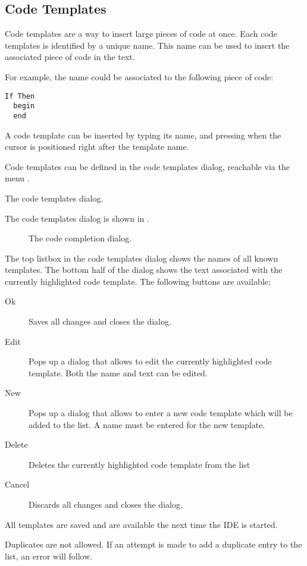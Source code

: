 \subsection{Code Templates}
Code templates are a way to insert large pieces of code at once. Each 
code templates is identified by a unique name. This name can be used to
insert the associated piece of code in the text.

For example, the name  could be associated to the following
piece of code:
\begin{verbatim}
If Then
  begin
  end
\end{verbatim}
A code template can be inserted by typing its name, and pressing 
when the cursor is positioned right after the template name.

Code templates can be defined in the code templates dialog, reachable via
the menu . 

\begin{htmlonly}
The code templates dialog.
\end{htmlonly}
\begin{latexonly}
The code templates dialog is shown in .
\begin{figure}[ht]
\caption{The code completion dialog.}\label{fig:codetemp}
\ifpdf
{}
\else
{}
\fi
\end{figure}
\end{latexonly}
The top listbox in the code templates dialog shows the names of all 
known templates. The bottom half of the dialog shows the text associated
with the currently highlighted code template.
The following buttons are available:
\begin{description}
\item[Ok] Saves all changes and closes the dialog.
\item[Edit] Pops up a dialog that allows to edit the currently 
highlighted code template. Both the name and text can be edited.
\item[New] Pops up a dialog that allows to enter a new code template
which will be added to the list. A name must be entered for the new
template.
\item[Delete] Deletes the currently highlighted code template from the list
\item[Cancel] Discards all changes and closes the dialog.
\end{description}
All templates are saved and are available the next time the IDE is started.
\begin{remark}
Duplicates are not allowed. If an attempt is made to add a duplicate entry 
to the list, an error will follow.
\end{remark}

